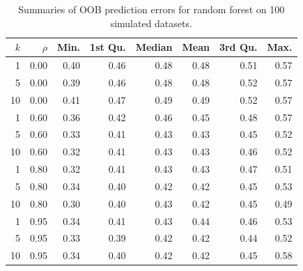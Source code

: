 \begin{table}[ht]
\centering
\caption{Summaries of OOB prediction errors for random forest on 100 simulated datasets.} 
\label{tab:pred.bin}
\begin{tabular}{rrrrrrrr}
  \toprule
$k$ & $\rho$ & Min. & 1st Qu. & Median & Mean & 3rd Qu. & Max. \\ 
  \midrule
1 & 0.00 & 0.40 & 0.46 & 0.48 & 0.48 & 0.51 & 0.57 \\ 
  5 & 0.00 & 0.39 & 0.46 & 0.48 & 0.48 & 0.52 & 0.57 \\ 
  10 & 0.00 & 0.41 & 0.47 & 0.49 & 0.49 & 0.52 & 0.57 \\ 
  1 & 0.60 & 0.36 & 0.42 & 0.46 & 0.45 & 0.48 & 0.57 \\ 
  5 & 0.60 & 0.33 & 0.41 & 0.43 & 0.43 & 0.45 & 0.52 \\ 
  10 & 0.60 & 0.32 & 0.41 & 0.43 & 0.43 & 0.46 & 0.52 \\ 
  1 & 0.80 & 0.32 & 0.41 & 0.43 & 0.43 & 0.47 & 0.51 \\ 
  5 & 0.80 & 0.34 & 0.40 & 0.42 & 0.42 & 0.45 & 0.53 \\ 
  10 & 0.80 & 0.30 & 0.40 & 0.43 & 0.42 & 0.45 & 0.49 \\ 
  1 & 0.95 & 0.34 & 0.41 & 0.43 & 0.44 & 0.46 & 0.53 \\ 
  5 & 0.95 & 0.33 & 0.39 & 0.42 & 0.42 & 0.44 & 0.52 \\ 
  10 & 0.95 & 0.34 & 0.40 & 0.42 & 0.42 & 0.45 & 0.58 \\ 
   \bottomrule
\end{tabular}
\end{table}
